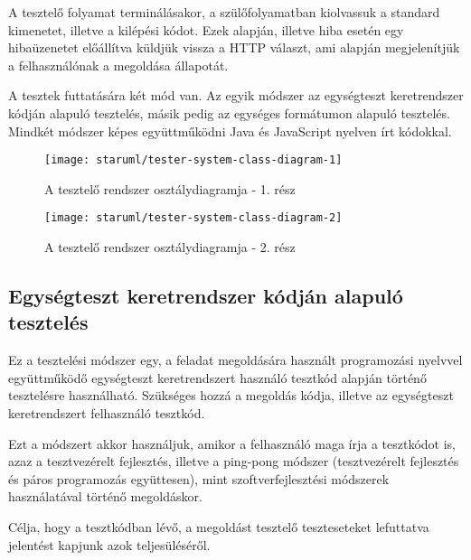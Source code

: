 \documentclass{elteikthesis}
\begin{document}
			A tesztelő folyamat terminálásakor, a szülőfolyamatban kiolvassuk a standard kimenetet, illetve a kilépési kódot. Ezek alapján, illetve hiba esetén egy hibaüzenetet előállítva küldjük vissza a HTTP választ, ami alapján megjelenítjük a felhasználónak a megoldása állapotát.
		
			A tesztek futtatására két mód van. Az egyik módszer az egységteszt keretrendszer kódján alapuló tesztelés, másik pedig az egységes formátumon alapuló tesztelés. Mindkét módszer képes együttműködni Java és JavaScript nyelven írt kódokkal.

			\begin{figure}[H]
				\centering
				\texttt{[image: staruml/tester-system-class-diagram-1]}
				\caption{A tesztelő rendszer osztálydiagramja - 1. rész}
			\end{figure}
			
			\begin{figure}[H]
				\centering
				\texttt{[image: staruml/tester-system-class-diagram-2]}
				\caption{A tesztelő rendszer osztálydiagramja - 2. rész}
			\end{figure}
			
			\subsection{Egységteszt keretrendszer kódján alapuló tesztelés}
				Ez a tesztelési módszer egy, a feladat megoldására használt programozási nyelvvel együttműködő egységteszt keretrendszert használó tesztkód alapján történő tesztelésre használható. Szükséges hozzá a megoldás kódja, illetve az egységteszt keretrendszert felhasználó tesztkód.
				
				Ezt a módszert akkor használjuk, amikor a felhasználó maga írja a tesztkódot is, azaz a tesztvezérelt fejlesztés, illetve a ping-pong módszer (tesztvezérelt fejlesztés és páros programozás együttesen), mint szoftverfejlesztési módszerek használatával történő megoldáskor.
				
				Célja, hogy a tesztkódban lévő, a megoldást tesztelő teszteseteket lefuttatva jelentést kapjunk azok teljesüléséről.
\end{document}
